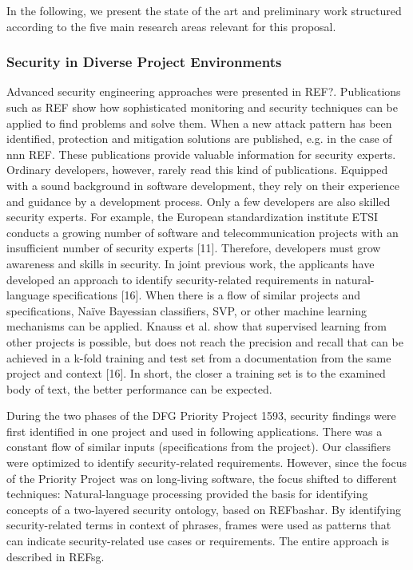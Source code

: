 In the following, we present the state of the art and preliminary work structured according to the five main research areas relevant for this proposal.

\vspace{-0.5em}
\subsubsection*{Security in Diverse Project Environments}
\vspace{-1em}
Advanced security engineering approaches were presented in REF?. Publications such as REF show how sophisticated monitoring and security techniques can be applied to find problems and solve them. When a new attack pattern has been identified, protection and mitigation solutions are published, e.g. in the case of nnn REF. These publications provide valuable information for security experts. Ordinary developers, however, rarely read this kind of publications. Equipped with a sound background in software development, they rely on their experience and guidance by a development process. Only a few developers are also skilled security experts. For example, the European standardization institute ETSI conducts a growing number of software and telecommunication projects with an insufficient number of security experts [11]. Therefore, developers must grow awareness and skills in security. In joint previous work, the applicants have developed an approach to identify security-related requirements in natural-language specifications [16]. When there is a flow of similar projects and specifications, Naïve Bayessian classifiers, SVP, or other machine learning mechanisms can be applied. Knauss et al. show that supervised learning from other projects is possible, but does not reach the precision and recall that can be achieved in a k-fold training and test set from a documentation from the same project and context [16]. In short, the closer a training set is to the examined body of text, the better performance can be expected.

During the two phases of the DFG Priority Project 1593, security findings were first identified in one project and used in following applications. There was a constant flow of similar inputs (specifications from the project). Our classifiers were optimized to identify security-related requirements. However, since the focus of the Priority Project was on long-living software, the focus shifted to different techniques: Natural-language processing provided the basis for identifying concepts of a two-layered security ontology, based on REFbashar. By identifying security-related terms in context of phrases, frames were used as patterns that can indicate security-related use cases or requirements. The entire approach is described in REFsg.

